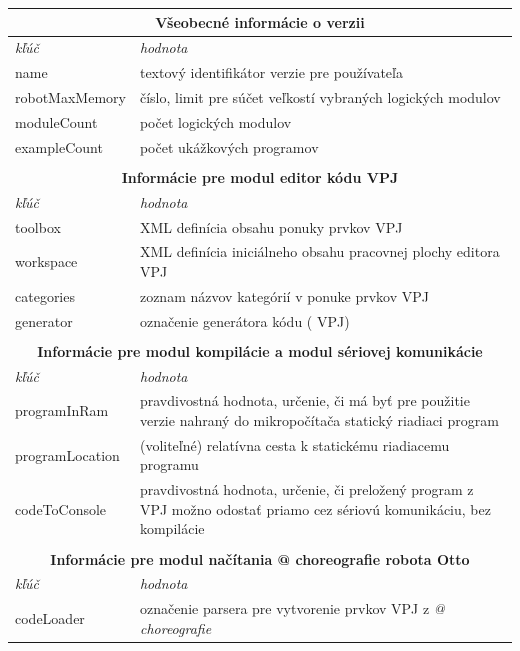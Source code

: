\begin{table}\footnotesize
\centering
\begin{tabular}{ |p{3.8cm}|p{10cm}|  }
 \hline
	\multicolumn{2}{|c|}{\textbf{Všeobecné informácie o verzii}} \\
 \hline
	\textit{kľúč} & \textit{hodnota}\\
 \hline
	name&textový identifikátor verzie pre používateľa\\
	robotMaxMemory&číslo, limit pre súčet veľkostí vybraných logických modulov\\
	moduleCount&počet logických modulov\\
	exampleCount&počet ukážkových programov\\
 \hline

 \multicolumn{2}{c}{} \\
 \multicolumn{2}{c}{\textbf{Informácie pre modul editor kódu VPJ}} \\
 \hline
	\textit{kľúč} & \textit{hodnota}\\
 \hline
 	toolbox&XML definícia obsahu ponuky prvkov VPJ\\
 	workspace&XML definícia iniciálneho obsahu pracovnej plochy editora VPJ\\
 	categories&zoznam názvov kategórií v ponuke prvkov VPJ\\
 	generator&označenie generátora kódu (\uv{prekladača} VPJ)\\
 \hline

 \multicolumn{2}{c}{} \\
 \multicolumn{2}{c}{\textbf{Informácie pre modul kompilácie a modul sériovej komunikácie}} \\
 \hline
	\textit{kľúč} & \textit{hodnota}\\
 \hline
	programInRam&pravdivostná hodnota, určenie, či má byť pre použitie verzie nahraný do mikropočítača statický riadiaci program\\
	programLocation&(voliteľné) relatívna cesta k statickému riadiacemu programu\\
	codeToConsole&pravdivostná hodnota, určenie, či preložený program z VPJ možno odostať priamo cez sériovú komunikáciu, bez kompilácie\\
 \hline

 \multicolumn{2}{c}{} \\
 \multicolumn{2}{c}{\textbf{Informácie pre modul načítania @ choreografie robota Otto}} \\
 \hline
	\textit{kľúč} & \textit{hodnota}\\
 \hline
	codeLoader&označenie parsera pre vytvorenie prvkov VPJ z \textit{@ choreografie}\\
 \hline


\end{tabular}
\end{table}
